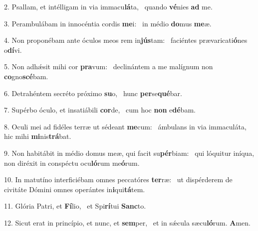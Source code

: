 2. Psallam, et intélligam in via immacu\textbf{lá}ta, \ast\  quando \textbf{vé}nies \textbf{ad} me.\

3. Perambulábam in innocéntia cordis \textbf{me}i: \ast\  in médio \textbf{do}mus \textbf{me}æ.\

4. Non proponébam ante óculos meos rem in\textbf{jús}tam: \ast\  faciéntes prævaricati\textbf{ó}nes o\textbf{dí}vi.\

5. Non adhǽsit mihi cor \textbf{pra}vum: \ast\  declinántem a me malígnum non \textbf{co}gno\textbf{scé}bam.\

6. Detrahéntem secréto próximo \textbf{su}o, \ast\  hunc \textbf{per}se\textbf{qué}bar.\

7. Supérbo óculo, et insatiábili \textbf{cor}de, \ast\  cum hoc \textbf{non} e\textbf{dé}bam.\

8. Oculi mei ad fidéles terræ ut sédeant \textbf{me}cum: \ast\  ámbulans in via immaculáta, hic mihi \textbf{mi}nis\textbf{trá}bat.\

9. Non habitábit in médio domus meæ, qui facit su\textbf{pér}biam: \ast\  qui lóquitur iníqua, non diréxit in conspéctu ocu\textbf{ló}rum me\textbf{ó}rum.\

10. In matutíno interficiébam omnes peccatóres \textbf{ter}ræ: \ast\  ut dispérderem de civitáte Dómini omnes operántes in\textbf{i}qui\textbf{tá}tem.\

11. Glória Patri, et \textbf{Fí}lio, \ast\  et Spi\textbf{rí}tui \textbf{Sanc}to.\

12. Sicut erat in princípio, et nunc, et \textbf{sem}per, \ast\  et in sǽcula sæcu\textbf{ló}rum. \textbf{A}men.\

